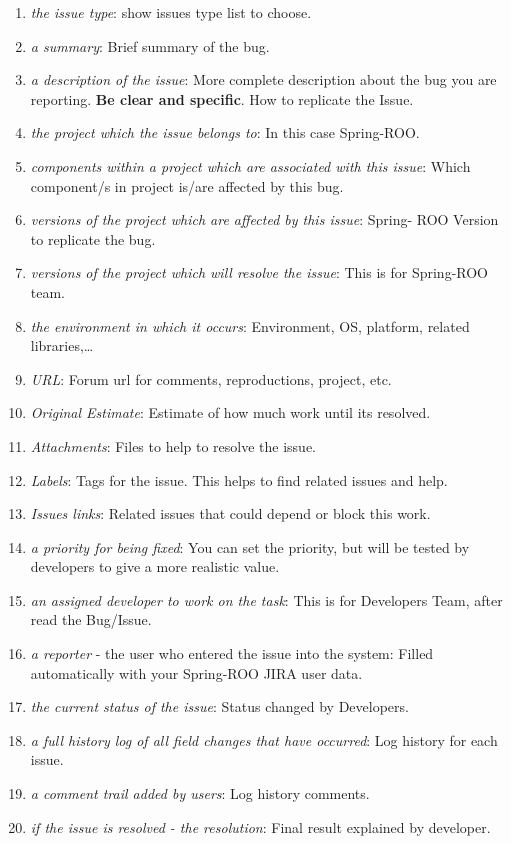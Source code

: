\documentclass[11pt]{scrartcl}
\begin{document}
\begin{enumerate}
	\item \emph{the issue type}: show issues type list to choose.
	\item \emph{a summary}: Brief summary of the bug.
	\item \emph{a description of the issue}: More complete description about the bug you are reporting. \textbf{Be clear and specific}. How to replicate the Issue.
	\item \emph{the project which the issue belongs to}: In this case Spring-ROO.
	\item \emph{components within a project which are associated with this issue}: Which component/s in project is/are affected by this bug.
	\item \emph{versions of the project which are affected by this issue}: Spring- ROO Version to replicate the bug.
	\item \emph{versions of the project which will resolve the issue}: This is for Spring-ROO team.
	\item \emph{the environment in which it occurs}: Environment, OS, platform, related libraries,\ldots
	\item \emph{URL}: Forum url for comments, reproductions, project, etc.
	\item \emph{Original Estimate}: Estimate of how much work until its resolved.
	\item \emph{Attachments}: Files to help to resolve the issue.
	\item \emph{Labels}: Tags for the issue. This helps to find related issues and help.
	\item \emph{Issues links}: Related issues that could depend or block this work.
	\item \emph{a priority for being fixed}: You can set the priority, but will be tested by developers to give a more realistic value.
	\item \emph{an assigned developer to work on the task}: This is for Developers Team, after read the Bug/Issue.
	\item \emph{a reporter} - the user who entered the issue into the system: Filled automatically with your Spring-ROO JIRA user data.
	\item \emph{the current status of the issue}: Status changed by Developers.
	\item \emph{a full history log of all field changes that have occurred}: Log history for each issue.
	\item \emph{a comment trail added by users}: Log history comments.
	\item \emph{if the issue is resolved - the resolution}: Final result explained by developer.
\end{enumerate}
\end{document}
